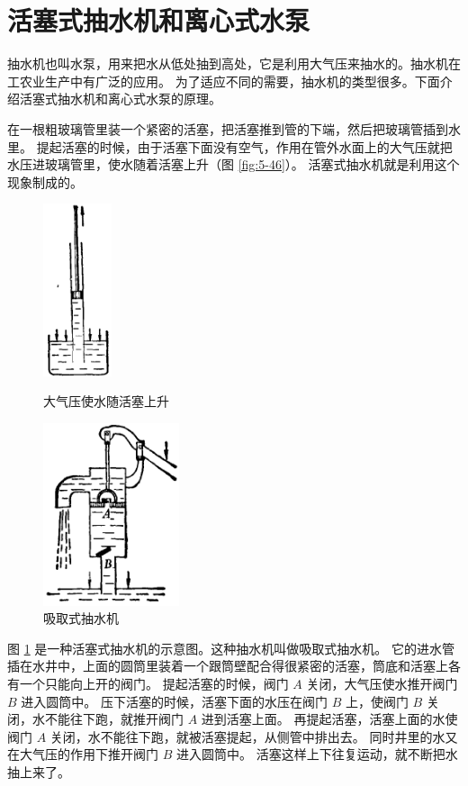 \section{活塞式抽水机和离心式水泵}\label{sec:5-13}

抽水机也叫水泵，用来把水从低处抽到高处，它是利用大气压来抽水的。抽水机在工农业生产中有广泛的应用。
为了适应不同的需要，抽水机的类型很多。下面介绍活塞式抽水机和离心式水泵的原理。

在一根粗玻璃管里装一个紧密的活塞，把活塞推到管的下端，然后把玻璃管插到水里。
提起活塞的时候，由于活塞下面没有空气，作用在管外水面上的大气压就把水压进玻璃管里，使水随着活塞上升（图 \ref{fig:5-46}）。
活塞式抽水机就是利用这个现象制成的。

\begin{figure}[htbp]
    \centering
    \begin{minipage}{7cm}
    \centering
    \includegraphics[width=2cm]{../pic/czwl1-ch5-46}
    \caption{大气压使水随活塞上升}\label{fig:5-46}
    \end{minipage}
    \qquad
    \begin{minipage}{7cm}
    \centering
    \includegraphics[width=4cm]{../pic/czwl1-ch5-47}
    \caption{吸取式抽水机}\label{fig:5-47}
    \end{minipage}
\end{figure}

图 \ref{fig:5-47} 是一种活塞式抽水机的示意图。这种抽水机叫做吸取式抽水机。
它的进水管插在水井中，上面的圆筒里装着一个跟筒壁配合得很紧密的活塞，筒底和活塞上各有一个只能向上开的阀门。
提起活塞的时候，阀门 $A$ 关闭，大气压使水推开阀门 $B$ 进入圆筒中。
压下活塞的时候，活塞下面的水压在阀门 $B$ 上，使阀门 $B$ 关闭，水不能往下跑，就推开阀门 $A$ 进到活塞上面。
再提起活塞，活塞上面的水使阀门 $A$ 关闭，水不能往下跑，就被活塞提起，从侧管中排出去。
同时井里的水又在大气压的作用下推开阀门 $B$ 进入圆筒中。
活塞这样上下往复运动，就不断把水抽上来了。

